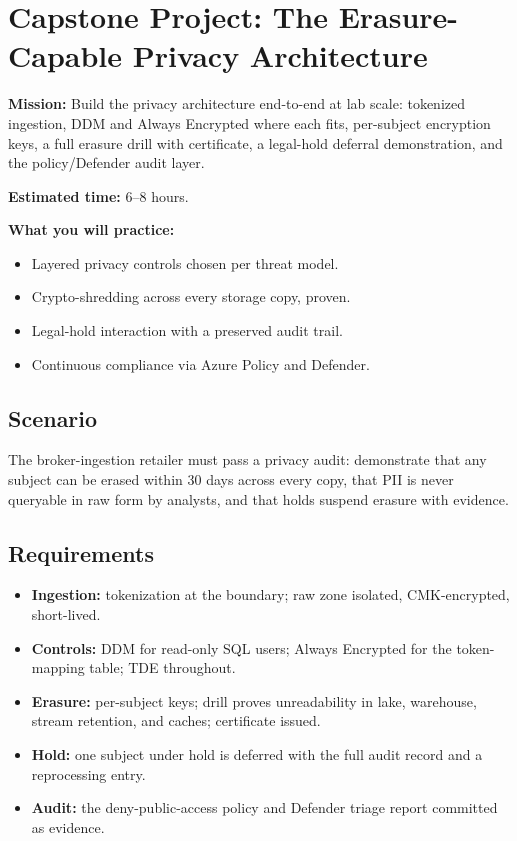 \section{Capstone Project: The Erasure-Capable Privacy Architecture}\label{sec:ch23-capstone}

\begin{capstonebox}
\textbf{Mission:} Build the privacy architecture end-to-end at lab scale: tokenized ingestion, DDM and Always Encrypted where each fits, per-subject encryption keys, a full erasure drill with certificate, a legal-hold deferral demonstration, and the policy/Defender audit layer.

\textbf{Estimated time:} 6--8 hours.

\textbf{What you will practice:}
\begin{itemize}
    \item Layered privacy controls chosen per threat model.
    \item Crypto-shredding across every storage copy, proven.
    \item Legal-hold interaction with a preserved audit trail.
    \item Continuous compliance via Azure Policy and Defender.
\end{itemize}
\end{capstonebox}

\subsection*{Scenario}
The broker-ingestion retailer must pass a privacy audit: demonstrate that any subject can be erased within 30 days across every copy, that PII is never queryable in raw form by analysts, and that holds suspend erasure with evidence.

\subsection*{Requirements}
\begin{itemize}
    \item \textbf{Ingestion:} tokenization at the boundary; raw zone isolated, CMK-encrypted, short-lived.
    \item \textbf{Controls:} DDM for read-only SQL users; Always Encrypted for the token-mapping table; TDE throughout.
    \item \textbf{Erasure:} per-subject keys; drill proves unreadability in lake, warehouse, stream retention, and caches; certificate issued.
    \item \textbf{Hold:} one subject under hold is deferred with the full audit record and a reprocessing entry.
    \item \textbf{Audit:} the deny-public-access policy and Defender triage report committed as evidence.
\end{itemize}


